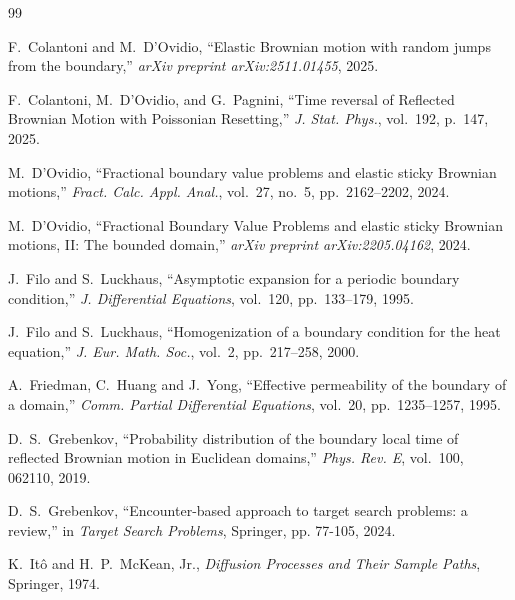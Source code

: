 \documentclass[11pt]{amsart}
\theoremstyle{plain}
\theoremstyle{definition}
\theoremstyle{remark}
\begin{document}
\begin{thebibliography}{99}
		
		F.~Colantoni and M.~D'Ovidio, ``Elastic Brownian motion with random jumps from the boundary,'' \textit{arXiv preprint arXiv:2511.01455}, 2025.
		
		F.~Colantoni, M.~D'Ovidio, and G.~Pagnini, ``Time reversal of Reflected Brownian Motion with Poissonian Resetting,'' \textit{J. Stat. Phys.}, vol.~192, p.~147, 2025.
		
		M.~D'Ovidio, ``Fractional boundary value problems and elastic sticky Brownian motions,'' \textit{Fract. Calc. Appl. Anal.}, vol.~27, no.~5, pp.~2162--2202, 2024.
		
		M.~D'Ovidio, ``Fractional Boundary Value Problems and elastic sticky Brownian motions, II: The bounded domain,'' \textit{arXiv preprint arXiv:2205.04162}, 2024.
		
		J.~Filo and S.~Luckhaus, ``Asymptotic expansion for a periodic boundary condition,'' \textit{J. Differential Equations}, vol.~120, pp.~133--179, 1995.
		
		J.~Filo and S.~Luckhaus, ``Homogenization of a boundary condition for the heat equation,'' \textit{J. Eur. Math. Soc.}, vol.~2, pp.~217--258, 2000.
		
		A.~Friedman, C.~Huang and J.~Yong, ``Effective permeability of the boundary of a domain,'' \textit{Comm. Partial Differential Equations}, vol.~20, pp.~1235--1257, 1995.
		
		D.~S.~Grebenkov, ``Probability distribution of the boundary local time of reflected Brownian motion in Euclidean domains,'' \textit{Phys. Rev. E}, vol.~100, 062110, 2019.
		
		D.~S.~Grebenkov, ``Encounter-based approach to target search problems: a review,'' in \textit{Target Search Problems}, Springer, pp. 77-105, 2024.
		
		K.~It\^{o} and H.~P.~McKean, Jr., \textit{Diffusion Processes and Their Sample Paths}, Springer, 1974.
		
		

\end{thebibliography}
\end{document}
